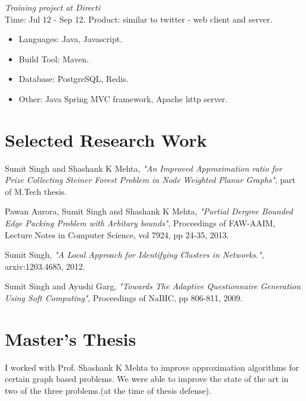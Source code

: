 \documentclass[margin,line]{resume}
\begin{document}
\begin{resume}
\textit{Training project at Directi}\\
Time: Jul 12 - Sep 12.
Product: similar to twitter - web client and server.\\
 \begin{itemize}
\item Languages: Java, Javascript.
\item Build Tool: Maven.
\item Database: PostgreSQL, Redis.
\item Other: Java Spring MVC framework, Apache http server.  
 \end{itemize}



    \section{\mysidestyle Selected Research Work}
\vspace{-2mm}
Sumit Singh and Shashank K Mehta, \textit{ "An Improved Approximation ratio for Prize Collecting Steiner Forest Problem in Node Weighted Planar Graphs"}, part of M.Tech thesis.

\vspace{-2mm}
Pawan Aurora, Sumit Singh and Shashank K Mehta, \textit{"Partial Dergree Bounded Edge Packing Problem with Arbitary bounds"}, Proceedings of FAW-AAIM, Lecture Notes in Computer Science, vol 7924, pp 24-35, 2013. 

\vspace{-2mm}
Sumit Singh, \textit{"A Local Approach for Identifying Clusters in Networks."}, arxiv:1203.4685, 2012.

\vspace{-2mm}
Sumit Singh and Ayushi Garg, \textit{"Towards The Adaptive Questionnaire Generation Using Soft Computing"}, Proceedings of NaBIC, pp 806-811, 2009.



    \section{\mysidestyle Master's Thesis}
I worked with Prof. Shashank K Mehta to improve approximation algorithms for certain graph based problems. We were able to improve the state of the art in two of the three problems.(at the time of thesis defense).
   

\end{resume}
\end{document}
